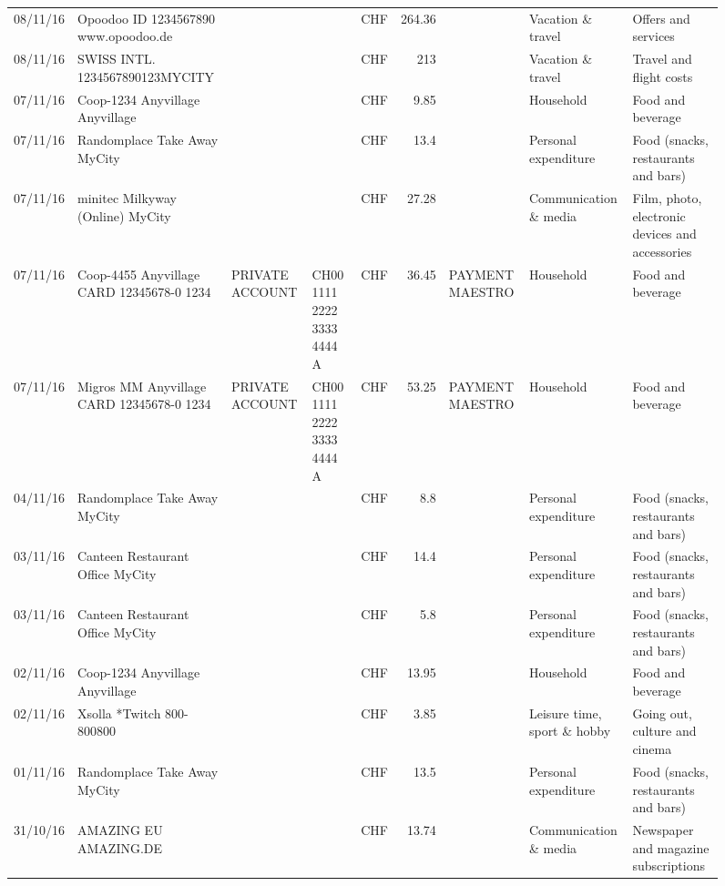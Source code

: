 \begin{landscape}
\begin{sidewaysfigure}
\begin{table}[h]
\begin{center}
\begin{tabular}{rllllrlll}
		08/11/16 & Opoodoo ID 1234567890      www.opoodoo.de &       &       & CHF   & 264.36 &       & Vacation \& travel & Offers and services \\
		08/11/16 & SWISS INTL. 1234567890123MYCITY &       &       & CHF   & 213   &       & Vacation \& travel & Travel and flight costs \\
		07/11/16 & Coop-1234 Anyvillage    Anyvillage &       &       & CHF   & 9.85  &       & Household & Food and beverage \\
		07/11/16 & Randomplace Take Away     MyCity &       &       & CHF   & 13.4  &       & Personal expenditure & Food (snacks, restaurants and bars) \\
		07/11/16 & minitec Milkyway (Online) MyCity &       &       & CHF   & 27.28 &       & Communication \& media & Film, photo, electronic devices and accessories \\
		07/11/16 & Coop-4455 Anyvillage CARD 12345678-0 1234 & PRIVATE ACCOUNT & CH00 1111 2222 3333 4444 A & CHF   & 36.45 & PAYMENT MAESTRO & Household & Food and beverage \\
		07/11/16 & Migros MM Anyvillage CARD 12345678-0 1234 & PRIVATE ACCOUNT & CH00 1111 2222 3333 4444 A & CHF   & 53.25 & PAYMENT MAESTRO & Household & Food and beverage \\
		04/11/16 & Randomplace Take Away     MyCity &       &       & CHF   & 8.8   &       & Personal expenditure & Food (snacks, restaurants and bars) \\
		03/11/16 & Canteen Restaurant Office      MyCity &       &       & CHF   & 14.4  &       & Personal expenditure & Food (snacks, restaurants and bars) \\
		03/11/16 & Canteen Restaurant Office      MyCity &       &       & CHF   & 5.8   &       & Personal expenditure & Food (snacks, restaurants and bars) \\
		02/11/16 & Coop-1234 Anyvillage    Anyvillage &       &       & CHF   & 13.95 &       & Household & Food and beverage \\
		02/11/16 & Xsolla *Twitch           800-800800 &       &       & CHF   & 3.85  &       & Leisure time, sport \& hobby & Going out, culture and cinema \\
		01/11/16 & Randomplace Take Away     MyCity &       &       & CHF   & 13.5  &       & Personal expenditure & Food (snacks, restaurants and bars) \\
		31/10/16 & AMAZING EU                AMAZING.DE &       &       & CHF   & 13.74 &       & Communication \& media & Newspaper and magazine subscriptions \\

\end{tabular}
\end{center}
\end{table}
\end{sidewaysfigure}
\end{landscape}
